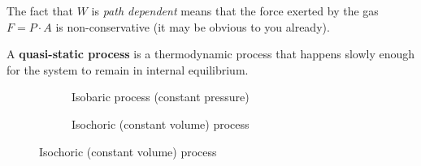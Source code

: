 The fact that $W$ is \emph{path dependent} means that the force exerted by
the gas $F=P\cdot A$ is non-conservative (it may be obvious to you already).

A \textbf{quasi-static process} is a thermodynamic process that happens slowly
enough for the system to remain in internal equilibrium.
\begin{figure}[ht]
  \centering
  \begin{subfigure}{.4\textwidth}
    \centering
    \caption{Isobaric process (constant pressure)}
    \label{fig:isobaric}
  \end{subfigure}
  \begin{subfigure}{.4\textwidth}
    \centering
    \caption{Isochoric (constant volume) process}
    \label{fig:isochoric}
  \end{subfigure}
  

\end{figure}
